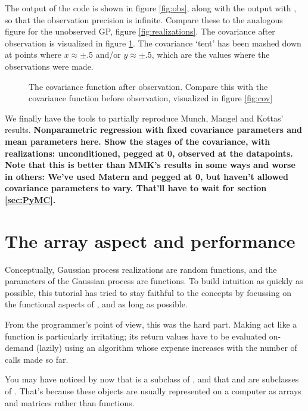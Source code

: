 \documentclass{manual}
\begin{document}
The output of the code is shown in figure \ref{fig:obs}, along with the output with , so that the observation precision is infinite. Compare these to the analogous figure for the unobserved GP, figure \ref{fig:realizations}. The covariance after observation is visualized in figure \ref{fig:obscov}. The covariance `tent' has been mashed down at points where $x\approx \pm .5$ and/or $y\approx\pm .5$, which are the values where the observations were made.

\begin{figure}
	\centering
	\caption{The covariance function after observation. Compare this with the covariance function before observation, visualized in figure \ref{fig:cov} }
	\label{fig:obscov}
\end{figure}

We finally have the tools to partially reproduce Munch, Mangel and Kottas' results. \textbf{Nonparametric regression with fixed covariance parameters and mean parameters here. Show the stages of the covariance, with realizations: unconditioned, pegged at 0, observed at the datapoints. Note that this is better than MMK's results in some ways and worse in others: We've used Matern and pegged at 0, but haven't allowed covariance parameters to vary. That'll have to wait for section \ref{sec:PyMC}.}



\section{The array aspect and performance}\label{sec:array} 
Conceptually, Gaussian process realizations are random functions, and the parameters of the Gaussian process are functions. To build intuition as quickly as possible, this tutorial has tried to stay faithful to the concepts by focussing on the functional aspects of ,  and  as long as possible. 

From the programmer's point of view, this was the hard part. Making  act like a function is particularly irritating; its return values have to be evaluated on-demand (lazily) using an algorithm whose expense increases with the number of calls made so far.

You may have noticed by now that  is a subclass of , and that  and  are subclasses of . That's because these objects are usually represented on a computer as arrays and matrices rather than functions.
\end{document}
